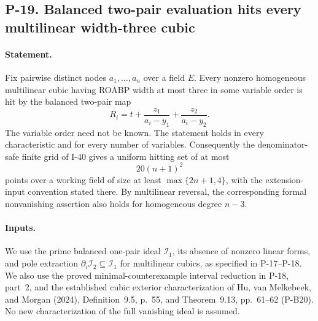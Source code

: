 \subsection{P-19. Balanced two-pair evaluation hits every multilinear width-three cubic}
\label{P-19}

\paragraph{Statement.}
Fix pairwise distinct nodes $a_1,\ldots,a_n$ over a field $E$.
Every nonzero homogeneous multilinear cubic having ROABP width
at most three in some variable order is hit by the balanced
two-pair map
\[
 R_i=t+\frac{z_1}{a_i-y_1}+\frac{z_2}{a_i-y_2}.
 \tag{P19.1}
\]
The variable order need not be known. The statement holds in
every characteristic and for every number of variables.
Consequently the denominator-safe finite grid of I-40 gives
a uniform hitting set of at most
\[
 20(n+1)^2
 \tag{P19.2}
\]
points over a working field of size at least
$\max\{2n+1,4\}$, with the extension-input convention stated
there. By multilinear reversal, the corresponding formal
nonvanishing assertion also holds for homogeneous degree
$n-3$.

\paragraph{Inputs.}
We use the prime balanced one-pair ideal $\mathcal I_1$, its
absence of nonzero linear forms, and pole extraction
$\partial_i\mathcal I_2\subseteq\mathcal I_1$ for multilinear
cubics, as specified in P-17--P-18. We also use the proved
minimal-counterexample interval reduction in P-18, part~2,
and the established cubic exterior characterization of
Hu, van Melkebeek, and Morgan (2024), Definition~9.5, p.~55,
and Theorem~9.13, pp.~61--62 (P-B20). No new characterization
of the full vanishing ideal is assumed.

